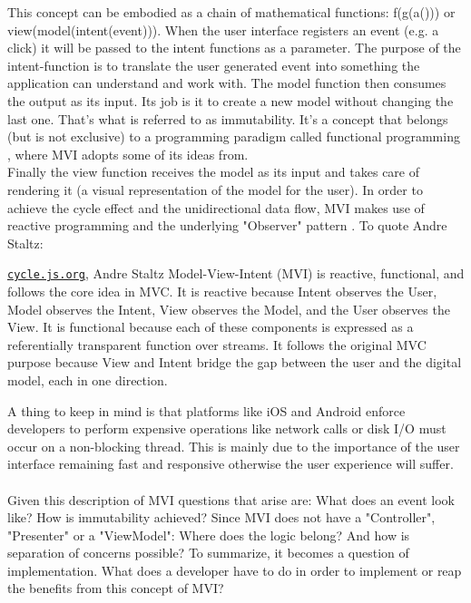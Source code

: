 This concept can be embodied as a chain of mathematical functions: f(g(a())) or view(model(intent(event))).
When the user interface registers an event (e.g. a click) it will be passed to the intent functions as a parameter. 
The purpose of the intent-function is to translate the user generated event into something the application can understand and work with.
The model function then consumes the output as its input. Its job is it to create a new model without changing the last one. That's what is referred to as immutability. 
\cite{immutableObjectsEffectiveJava}
It's a concept that belongs (but is not exclusive) to a programming paradigm called functional programming
\cite{functionalProgrammingWikiHaskell,functionalProgrammingPractical,programmingInHaskellFunctionalProgrammingDefinition},
where MVI adopts some of its ideas from.
\\
Finally the view function receives the model as its input and takes care of rendering it (a visual representation of the model for the user). 
In order to achieve the cycle effect and the unidirectional data flow, MVI makes use of reactive programming 
\cite{reactiveProgrammingIntroAndreStaltz} 
and the underlying "Observer" pattern 
\cite{wikipediaObserverPattern}.
To quote Andre Staltz:
\begin{pquotation}{\href{https://cycle.js.org/model-view-intent.html#model-view-intent-what-mvc-is-really-about}{\nolinkurl{cycle.js.org}}, Andre Staltz}
    Model-View-Intent (MVI) is reactive, functional, and follows the core idea in MVC. It is reactive because Intent observes the User, Model observes the Intent, 
    View observes the Model, and the User observes the View. It is functional because each of these components is expressed as a referentially transparent function 
    over streams. It follows the original MVC purpose because View and Intent bridge the gap between the user and the digital model, each in one direction.
\end{pquotation}
A thing to keep in mind is that platforms like iOS and Android enforce developers to perform expensive operations like network calls or disk I/O
\cite{wikipediaIO}
must occur on a non-blocking thread. This is mainly due to the importance of the user interface remaining fast and responsive otherwise the user experience will suffer.
\cite{androidKeepingYourAppResponsive,androidNetworkOnMainThreadException}
\\
\\
Given this description of MVI questions that arise are: What does an event look like? How is immutability achieved?
Since MVI does not have a "Controller", "Presenter" or a "ViewModel": Where does the logic belong? And how is separation of concerns possible?
To summarize, it becomes a question of implementation. What does a developer have to do in order to implement or reap the benefits from this concept of MVI?